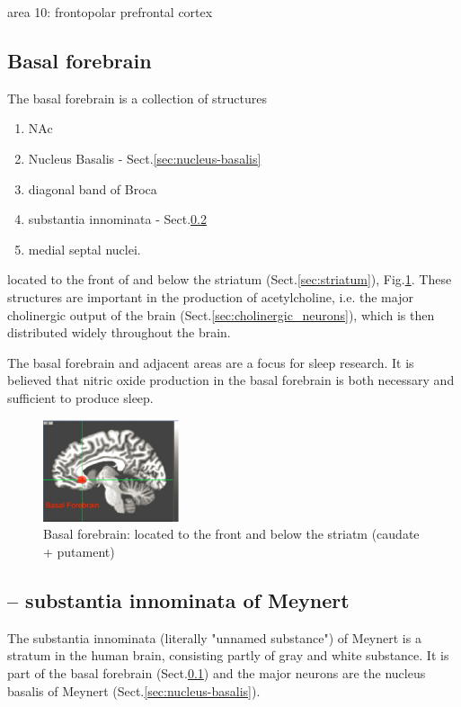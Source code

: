 area 10: frontopolar prefrontal cortex


\subsection{Basal forebrain}
\label{sec:basal-forebrain}

The basal forebrain is a collection of structures 
\begin{enumerate}
  \item NAc
  \item Nucleus Basalis - Sect.\ref{sec:nucleus-basalis}
  \item  diagonal band of Broca
  \item  substantia innominata - Sect.\ref{sec:substantia-innominata}
  \item medial septal nuclei.
\end{enumerate}
located to the front of and below the striatum (Sect.\ref{sec:striatum}),
Fig.\ref{fig:basal-forebrain}.
These structures are important in the production of acetylcholine, i.e. the
major cholinergic output of the brain (Sect.\ref{sec:cholinergic_neurons}),
which is then distributed widely throughout the brain.

The basal forebrain and adjacent areas are a focus for sleep research.
It is believed that nitric oxide production in the basal forebrain is both
necessary and sufficient to produce sleep. 

\begin{figure}[hbt]
  \centerline{\includegraphics[height=3cm,
    angle=0]{./images/basal-forebrain.eps}}
  \caption{Basal forebrain: located to the front and below the striatm
  (caudate + putament)}
  \label{fig:basal-forebrain}
\end{figure}

\subsection{-- substantia innominata of Meynert}
\label{sec:substantia-innominata}

The substantia innominata (literally "unnamed substance") of Meynert is a
stratum in the human brain, consisting partly of gray and white substance.
It is part of the basal forebrain (Sect.\ref{sec:basal-forebrain}) and the major
neurons are the nucleus basalis of Meynert (Sect.\ref{sec:nucleus-basalis}).

